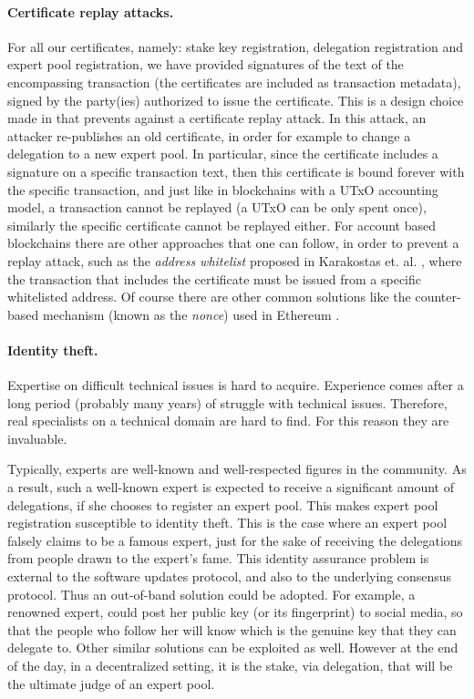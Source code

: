 \documentclass[11pt,a4paper]{article}
\begin{document}
\paragraph{Certificate replay attacks.}
For all our certificates, namely: stake key registration, delegation
registration and expert pool registration, we have provided signatures of the
text of the encompassing transaction (the certificates are included as
transaction metadata), signed by the party(ies) authorized to issue the
certificate. This is a design choice made in \cite{deldesign} that prevents
against a certificate replay attack. In this attack, an attacker re-publishes an
old certificate, in order for example to change a delegation to a new expert
pool. In particular, since the certificate includes a signature on a specific
transaction text, then this certificate is bound forever with the specific
transaction, and just like in blockchains with a UTxO accounting model, a
transaction cannot be replayed (a UTxO can be only spent once), similarly the
specific certificate cannot be replayed either. For account based blockchains
there are other approaches that one can follow, in order to prevent a replay
attack, such as the \emph{address whitelist} proposed in Karakostas et. al.
\cite{stakepools}, where the transaction that includes the certificate must be
issued from a specific whitelisted address. Of course there are other common
solutions like the counter-based mechanism (known as the \emph{nonce}) used in
Ethereum \cite{ethereum}.

\paragraph{Identity theft.}
Expertise on difficult technical issues is hard to acquire.
%
Experience comes after a long period (probably many years) of struggle with
technical issues.
%
Therefore, real specialists on a technical domain are hard to find. For this
reason they are invaluable.

Typically, experts are well-known and well-respected figures in the community.
As a result, such a well-known expert is expected to receive a significant
amount of delegations, if she chooses to register an expert pool.
%
This makes expert pool registration susceptible to identity theft. This is the
case where an expert pool falsely claims to be a famous expert, just for the
sake of receiving the delegations from people drawn to the expert's fame.
%
This identity assurance problem is external to the software updates protocol,
and also to the underlying consensus protocol. Thus an out-of-band solution
could be adopted. For example, a renowned expert, could post her public key (or
its fingerprint) to social media, so that the people who follow her will know
which is the genuine key that they can delegate to. Other similar solutions can
be exploited as well. However at the end of the day, in a decentralized setting,
it is the stake, via delegation, that will be the ultimate judge of an expert
pool.
\end{document}
